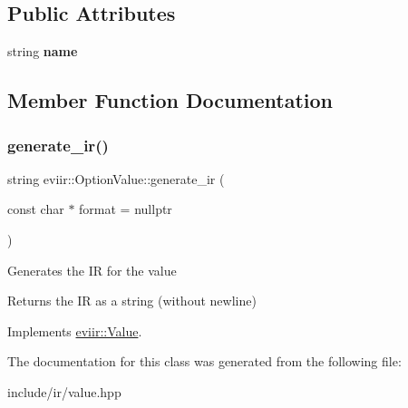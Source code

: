 \subsection*{Public Attributes}
\begin{DoxyCompactItemize}
\item 
\mbox{\label{classeviir_1_1OptionValue_ab8b3c911a0116a463813ffe5c7cf3c8f}} 
string {\bfseries name}
\end{DoxyCompactItemize}


\subsection{Member Function Documentation}
\mbox{\label{classeviir_1_1OptionValue_abb9e9cbaa9f6c0af697e5cbea035f56a}} 
\subsubsection{\texorpdfstring{generate\+\_\+ir()}{generate\_ir()}}
{\footnotesize\ttfamily string eviir\+::\+Option\+Value\+::generate\+\_\+ir (\begin{DoxyParamCaption}\item[{const char $\ast$}]{format = {\ttfamily nullptr} }\end{DoxyParamCaption})\hspace{0.3cm}{\ttfamily [virtual]}}

Generates the IR for the value \begin{DoxyReturn}{Returns}
the IR as a string (without newline) 
\end{DoxyReturn}


Implements \hyperlink{classeviir_1_1Value_a0613bf660425df31e230681555f64dea}{eviir\+::\+Value}.



The documentation for this class was generated from the following file\+:\begin{DoxyCompactItemize}
\item 
include/ir/value.\+hpp\end{DoxyCompactItemize}
